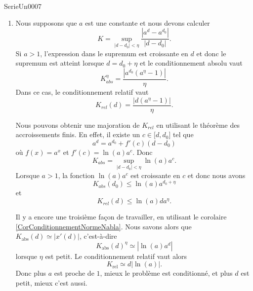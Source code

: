 
\begin{corrige}{SerieUn0007}

	\begin{enumerate}

		\item
			Nous supposons que $a$ est une constante et nous devons calculer
			\begin{equation}
				K=\sup_{| d-d_0 |<\eta}\frac{ | a^d-a^{d_0} | }{ | d-d_0 | }.
			\end{equation}
			Si $a>1$, l'expression dans le supremum est croissante en \( d\) et donc le supremum est atteint lorsque $d=d_0+\eta$ et le conditionnement absolu vaut
			\begin{equation}
				K_{abs}^{\eta}=\frac{ |a^{d_0}(a^{\eta}-1)| }{ \eta }.
			\end{equation}
			Dans ce cas, le conditionnement relatif vaut
			\begin{equation}
				K_{rel}(d)=\frac{ |d(a^{\eta}-1)| }{ \eta }.
			\end{equation}

			Nous pouvons obtenir une majoration de $K_{rel}$ en utilisant le théorème des accroissements finis. En effet, il existe un $c\in\mathopen[ d , d_0 \mathclose]$ tel que
			\begin{equation}
				a^d=a^{d_0}+f'(c)(d-d_0)
			\end{equation}
			où $f(x)=a^x$ et $f'(c)=\ln(a)a^c$. Donc
			\begin{equation}
				K_{abs}=\sup_{| d-d_0 |<\eta}\ln(a)a^c.
			\end{equation}
			Lorsque $a>1$, la fonction $\ln(a)a^c$ est croissante en $c$ et donc nous avons
			\begin{equation}
				K_{abs}(d_0)\leq \ln(a)a^{d_0+\eta}
			\end{equation}
			et
			\begin{equation}
				K_{rel}(d)\leq \ln(a)da^{\eta}.
			\end{equation}

			Il y a encore une troisième façon de travailler, en utilisant le corolaire \ref{CorConditionnementNormeNabla}. Nous savons alors que $K_{\text{abs}}(d)\simeq| x'(d) |$, c'est-à-dire
			\begin{equation}
				K_{\text{abs}}(d)^{\eta}\simeq| \ln(a)a^d |
			\end{equation}
			lorsque $\eta$ est petit. Le conditionnement relatif vaut alors
			\begin{equation}
				K_{\text{rel}}\simeq d| \ln(a) |.
			\end{equation}
			Donc plus $a$ est proche de $1$, mieux le problème est conditionné, et plus $d$ est petit, mieux c'est aussi.


\end{enumerate}
\end{corrige}
